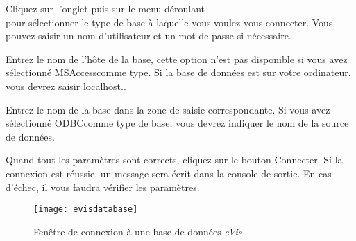 \label{evis_connect_database}


Cliquez sur l'onglet  puis sur le menu déroulant\\  pour sélectionner le type de base à laquelle vous voulez vous connecter. Vous pouvez saisir un nom d'utilisateur et un mot de passe si nécessaire.


Entrez le nom de l'hôte de la base, cette option n'est pas disponible si vous avez sélectionné \og MSAccess\fg  comme type. Si la base de données est sur votre ordinateur, vous devrez saisir \og localhost.\fg .


Entrez le nom de la base dans la zone de saisie correspondante. Si vous avez sélectionné \og ODBC\fg  comme type de base, vous devrez indiquer le nom de la source de données.


Quand tout les paramètres sont corrects, cliquez sur le bouton Connecter. Si la connexion est réussie, un message sera écrit dans la console de sortie. En cas d'échec, il vous faudra vérifier les paramètres.

\begin{figure}[ht]
   \begin{center}
\texttt{[image: evisdatabase]}
\caption{\label{evisdatabase}Fenêtre de connexion à une base de données \emph{eVis} \nixcaption}
\end{center}
\end{figure}

